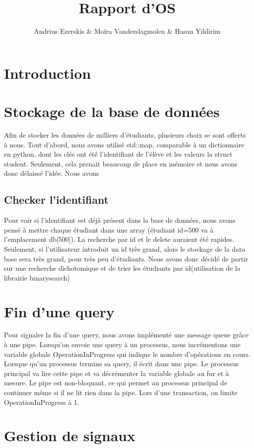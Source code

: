 \documentclass[utf8]{article}
\title{Rapport d'OS}
\author{Andrius Ezerskis \& Moïra Vanderslagmolen \& Hasan Yildirim}
\begin{document}
\section{Introduction}

\section{Stockage de la base de données}

Afin de stocker les données de milliers d'étudiants, plusieurs choix se sont offerts à nous. 
Tout d'abord, nous avons utilisé std::map, comparable à un dictionnaire en python, dont les
clés ont été l'identifiant de l'élève et les valeurs la struct student. Seulement, cela
prenait beaucoup de place en mémoire et nous avons donc délaissé l'idée. Nous avons 

\subsection{Checker l'identifiant}

Pour voir si l'identifiant est déjà présent dans la base de données, nous avons pensé à mettre chaque étudiant
dans une array (étudiant id=500 va à l'emplacement db[500]). La recherche par id et le delete auraient été rapides.
Seulement, si l'utilisateur introduit un id très grand, alors le stockage de la data base sera très grand, pour très peu d'étudiants.
Nous avons donc décidé de partir sur une recherche dichotomique et de trier les étudiants par id(utilisation de la librairie binarysearch)

\section{Fin d'une query}

Pour signaler la fin d'une query, nous avons implémenté une message queue grâce à une pipe. Lorsqu'on envoie 
une query à un processus, nous incrémentons une variable globale OperationInProgress qui indique le nombre d'opérations en cours.
Lorsque qu'un processus termine sa query, il écrit dans une pipe. Le processus principal va lire cette pipe et va décrémenter
la variable globale au fur et à mesure. Le pipe est non-bloquant, ce qui permet au processus principal de continuer
même si il ne lit rien dans la pipe. Lors d'une transaction, on limite OperationInProgress à 1.

\section{Gestion de signaux}
\end{document}
